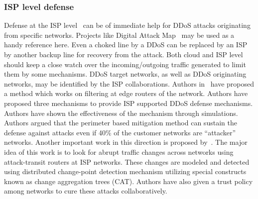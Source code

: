 \documentclass[final,5p,times,twocolumn]{elsarticle}
\begin{document}
\subsubsection{ISP level defense}
Defense at the ISP level~\cite{ISP} can be of immediate help for DDoS attacks originating from specific networks. Projects like Digital Attack Map~\cite{map} may be used as a handy reference here. Even a choked line by a DDoS can be replaced by an ISP by another backup line for recovery from the attack. Both cloud and ISP level should keep a close watch over the incoming/outgoing traffic generated to limit them by some mechanisms. DDoS target networks, as well as DDoS originating networks, may be identified by the ISP collaborations. Authors in~\cite{chen2005perimeter} have proposed a method which works on filtering at edge routers of the network. Authors have proposed three mechanisms to provide ISP supported DDoS defense mechanisms. Authors have shown the effectiveness of the mechanism through simulations. Authors argued that the perimeter based mitigation method can sustain the defense against attacks even if 40\% of the customer networks are ``attacker'' networks. Another important work in this direction is proposed by~\cite{chen2007collaborative}. The major idea of this work is to look for abrupt traffic changes across networks using attack-transit routers at ISP networks. These changes are modeled and detected using distributed change-point detection mechanism utilizing special constructs known as change aggregation trees (CAT). Authors have also given a trust policy among networks to cure these attacks collaboratively. 
\end{document}
